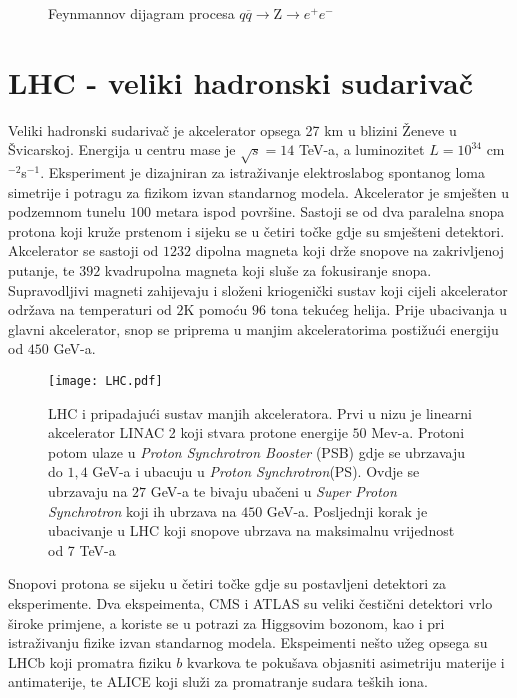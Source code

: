 \documentclass[a4paper,12pt]{report}
\newcommand{\proc}{Z$\rightarrow e^+ e^-$}
\begin{document}
\begin{figure}
 \centering
\caption{Feynmannov dijagram procesa $q\overline{q}\rightarrow $\proc}
\label{fig:fajmandijag}
\end{figure}




\chapter{LHC - veliki hadronski sudarivač}
\label{ch:method}
Veliki hadronski sudarivač je akcelerator  opsega 27 km u blizini Ženeve u Švicarskoj.  Energija u centru mase je $\sqrt{s}=14$ TeV-a, a luminozitet $L=10^{34}$ cm$^{-2}$s$^{-1}$.  Eksperiment je dizajniran za istraživanje elektroslabog spontanog loma simetrije i potragu za fizikom izvan standarnog modela.  
Akcelerator je smješten u podzemnom tunelu $100$ metara ispod površine.  Sastoji se od dva paralelna snopa protona koji kruže prstenom i sijeku se u četiri točke gdje su smješteni detektori. Akcelerator se sastoji od $1232$ dipolna magneta koji drže snopove na zakrivljenoj putanje, te $392$ kvadrupolna magneta koji sluše za fokusiranje snopa.  Supravodljivi magneti zahijevaju i složeni kriogenički sustav koji cijeli akcelerator održava na temperaturi od $2$K pomoću $96$ tona tekućeg helija.  Prije ubacivanja u glavni akcelerator, snop se priprema u manjim akceleratorima postižući energiju od $450$ GeV-a.
\begin{figure}%
\centering
\texttt{[image: LHC.pdf]}%
\caption[LHC i pripadajući sustav manjih akceleratora]{LHC i pripadajući sustav manjih akceleratora. Prvi u nizu je linearni akcelerator LINAC 2 koji stvara protone energije $50$ Mev-a. Protoni potom ulaze u \textit{Proton Synchrotron Booster} (PSB) gdje se ubrzavaju do $1,4$ GeV-a i ubacuju u \textit{Proton Synchrotron}(PS). Ovdje se ubrzavaju na $27$ GeV-a te bivaju ubačeni u \textit{Super Proton Synchrotron} koji ih ubrzava na $450$ GeV-a. Posljednji korak je ubacivanje u LHC koji snopove ubrzava na maksimalnu vrijednost od 7 TeV-a}%
\label{sustavakceleratora}%
\end{figure}
Snopovi protona se sijeku u četiri točke gdje su postavljeni detektori za eksperimente. Dva ekspeimenta, CMS i ATLAS su veliki čestični detektori vrlo široke primjene, a koriste se u potrazi za Higgsovim bozonom, kao i pri istraživanju fizike izvan standarnog modela. Ekspeimenti nešto užeg opsega su LHCb koji promatra fiziku $b$ kvarkova te pokušava objasniti asimetriju materije i antimaterije, te ALICE koji služi za promatranje sudara teških iona.
\end{document}
